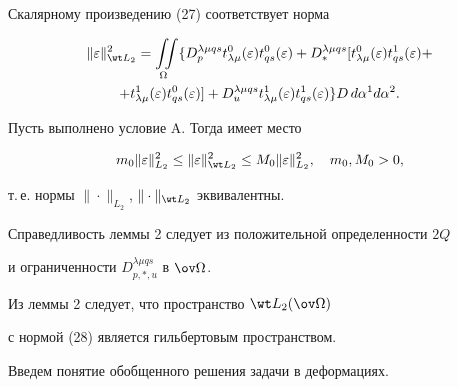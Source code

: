  


Скалярному произведению (27) соответствует норма 


\begin{multline} 


\|\varepsilon\|^2_{\wt L_2}= 


\iint\limits_\Omega\{D^{\lambda\mu qs}_p t^0_{\lambda\mu} 


(\varepsilon)t^0_{qs}(\varepsilon)+ 


D^{\lambda\mu qs}_*[t^0_{\lambda\mu}(\varepsilon)t^1_{qs} 


(\varepsilon)+ \\ 


+ t^1_{\lambda\mu}(\varepsilon)t^0_{qs}(\varepsilon)]+ 


D^{\lambda\mu qs}_u t^1_{\lambda\mu}(\varepsilon) 


t^1_{qs}(\varepsilon)\}D\,d\alpha^1d\alpha^2. 


\end{multline} 


 


\begin{lem} Пусть выполнено условие {\rom A}. Тогда имеет место 


$$ 


m_0\|\varepsilon\|^2_{L_2}\le \|\varepsilon\|^2_{\wt L_2} 


\le M_0\|\varepsilon\|^2_{L_2},\quad m_0,M_0>0, 


$$ 


т.\,е. нормы $\|\cdot\|_{L_2}$, $\|\cdot\|_{\wt L_2}$ эквивалентны. 


\end{lem} 


 


Справедливость леммы 2 следует из положительной определенности $2Q$ 


и ограниченности $D^{\lambda\mu{}qs}_{p,*,u}$ в $\ov\Omega$. 


 


Из леммы 2 следует, что пространство $\wt L_2(\ov\Omega)$ 


с нормой (28) является гильбертовым пространством. 


 


Введем понятие обобщенного решения задачи в деформациях. 


 


